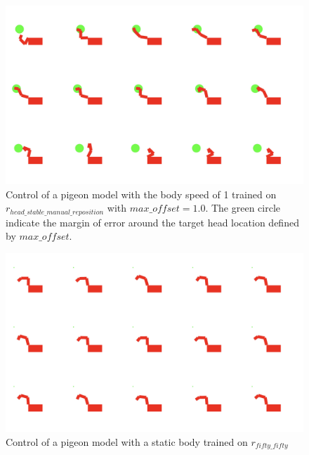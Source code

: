   \begin{figure}[H]
      \centering
      \includegraphics[width=1\textwidth]{figures/frames/frames_003.png}
      \caption{Control of a pigeon model with the body speed of 1 trained on $r_{head\_stable\_manual\_reposition}$ with $max\_offset = 1.0$. The green circle indicate the margin of error around the target head location defined by $max\_offset$.}
      \label{fig:manual_trajectory_not_strict_body_speed_1}
  \end{figure}

  \begin{figure}[H]
      \centering
      \includegraphics[width=1\textwidth]{figures/frames/frames_004.png}
      \caption{Control of a pigeon model with a static body trained on $r_{fifty\_fifty}$}
      \label{fig:fifty_fifty_body_speed_0}
  \end{figure}

